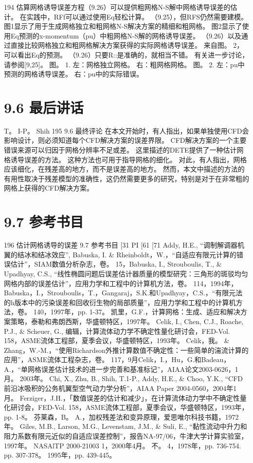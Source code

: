 \documentclass[UTF8,11pt,a4paper,openany,fontset=fandol]{ctexbook}
\begin{document}
194 估算网格诱导误差方程（9.26）可以提供粗网格N-S解中网格诱导误差的估计。 在实践中，RFf可以通过使用Eq轻松计算。 （9.25），但RFS仍然需要建模。 图1显示了用于生成网格独立和粗网格N-S解决方案的精细和粗网格。 图2显示了使用Eq预测的x-momentum（pu）中粗网格N-S解的网格诱导误差。 （9.26）以及通过直接比较网格独立和粗网格解决方案获得的实际网格诱导误差。 来自图。 2，可以看出Eq的预测。 （9.26）只要R::是准确的，就相当不错。 有关进一步讨论，请参阅[9,25]。 图。 1. 左：网格独立网格。 右：粗网格网格。 图。 2. 左：pu中预测的网格诱导误差。 右：pu中的实际错误。

\section{9.6 最后讲话}
T。 I-P。 Shih 195 9.6 最终评论 在本文开始时，有人指出，如果单独使用CFD会影响设计，则必须知道每个CFD解决方案的误差界限。 CFD解决方案的一个主要错误来源可以归因于网格分辨率不足或差。 这里描述的DETE提供了一种估计网格诱导误差的方法。 这种方法也可用于指导网格的细化。 对此，有人指出，网格应该细化，在残差高的地方，而不是误差高的地方。 然而，本文中描述的方法的有用性取决于残差模型的准确性，这仍然需要更多的研究，特别是对于在非常粗的网格上获得的CFD解决方案。

\section{9.7 参考书目}
196 估计网格诱导的误差 9.7 参考书目 [31 PI [61 [71 Addy, H.E., “调制解调器机翼的结冰和结冰效应”, Babuska, I. \& Rheinboldt，W.，“自适应有限元计算的错误估计”，SIAM数值分析杂志，卷。 15，Babuska, I., Strouboulis, T., \& Upadhyay, C.S., “线性椭圆问题后误差估计器质量的模型研究：三角形的斑驳均匀网格内部的误差估计”，应用力学和工程中的计算机方法，卷。 114，1994年，Babuska，I.，Strouboulis，T.，Gangaraj，S.K.和Upadhyay，C.S.，“有限元法的h版本中的污染误差和回收衍生物的局部质量”，应用力学和工程中的计算机方法，卷。 140，1997年，pp. 1-37。 凯里，G.F.，计算网格：生成、适应和解决方案策略，泰勒和弗朗西斯，华盛顿特区，1997年。 Celik, I., Chen, C.J., Roache, P.J., \& Scheuer, G., 编辑，计算流体动力学不确定性量化研讨会，FED-Vol. 158，ASME流体工程部，夏季会议，华盛顿特区，1993年。 Celik，我。 \& Zhang，W.-M.，“使用Richardson外推计算数值不确定性：一些简单的湍流计算的应用”，ASME流体工程杂志，卷。 117，9月Celik，I.，Hu，G.和Badeau，A.，“单网格误差估计技术的进一步完善和基准标记”，AIAA论文2003-0626，1月。 2003年。 Chi, X., Zhu, B., Shih, T.1-P., Addy, H.E., \& Choo, Y.K., “CFD 前沿冰吸积的公务机翼型空气动力学分析”，AIAA Paper 2004-0560，2004年1月。 Ferziger，J.H.，「数值误差的估计和减少」，在计算流体动力学中不确定性量化研讨会，FED-Vol. 158，ASME流体工程部，夏季会议，华盛顿特区，1993年，pp. 1-8。 芬莱森，B。 A.，加权残差法和变异原理，爱思唯尔科技书籍，1972年。 Giles, M.B., Larson, M.G., Levenstam, J.M., \& Suli, E., “黏性流动中升力和阻力系数有限元近似的自适应误差控制”，报告NA-97/06，牛津大学计算实验室，1997年。 NASAlTP 2000-21003 1，2000年4月。 不。 4，1978年，pp. 736-754. pp. 307-378。 1995年，pp. 439-445。
\end{document}
